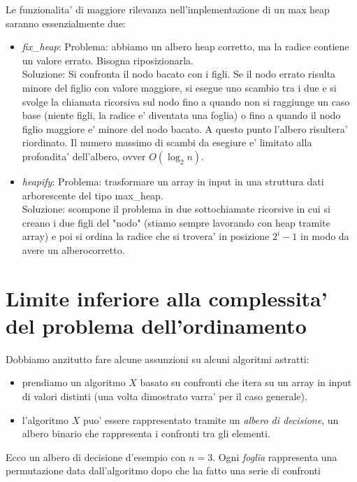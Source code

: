 \documentclass{article}
\begin{document}
Le funzionalita' di maggiore rilevanza nell'implementazione di un max heap saranno essenzialmente due:
\begin{itemize}
  \item \emph{fix\_heap}: Problema: abbiamo un albero heap corretto, ma la radice
    contiene un valore errato. Bisogna riposizionarla. \\
    Soluzione: Si confronta il nodo bacato con i figli. Se il nodo errato risulta
    minore del figlio con valore maggiore, si esegue uno scambio tra i due e si
    svolge la chiamata ricorsiva sul nodo fino a quando non si raggiunge un caso
    base (niente figli, la radice e' diventata una foglia) o fino a quando il nodo
    figlio maggiore e' minore del nodo bacato. A questo punto l'albero risultera'
    riordinato. Il numero massimo di scambi da esegiure e' limitato alla profondita'
    dell'albero, ovver $O(\log_2 n)$.

  \item \emph{heapify}: Problema: trasformare un array in input in una struttura
    dati arborescente del tipo max\_heap. \\
    Soluzione: scompone il problema in due sottochiamate ricorsive in cui si
    creano i due figli del "nodo" (stiamo sempre lavorando con heap tramite
    array) e poi si ordina la radice che si trovera' in posizione $2^i-1$ in
    modo da avere un alberocorretto.
\end{itemize}

\section{Limite inferiore alla complessita' del problema dell'ordinamento}

Dobbiamo anzitutto fare alcune assunzioni su alcuni algoritmi astratti:
\begin{itemize}
  \item prendiamo un algoritmo $X$ basato su confronti che itera su un array in
    input di valori distinti (una volta dimostrato varra' per il caso generale).
  \item l'algoritmo $X$ puo' essere rappresentato tramite un \emph{albero di
    decisione}, un albero binario che rappresenta i confronti tra gli elementi.
\end{itemize}

Ecco un albero di decisione d'esempio con $n = 3$. Ogni \emph{foglia} rappresenta
una permutazione data dall'algoritmo dopo che ha fatto una serie di confronti
\end{document}
